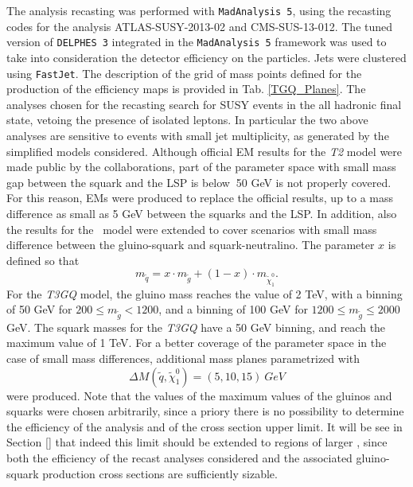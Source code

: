 \documentclass[epj,nopacs,fleqn]{svjour}
\begin{document}
%
The analysis recasting was performed with \texttt{MadAnalysis 5}, using the recasting codes for the analysis ATLAS-SUSY-2013-02\cite{ATLAS-SUSY-2013-02MA5,ATLAS-SUSY-2013-02VALIDATION} and CMS-SUS-13-012\cite{CMS-SUS-13-012MA5,CMS-SUS-13-012VALIDATION}. The tuned version of \texttt{DELPHES 3} integrated in the \texttt{MadAnalysis 5} framework was used to take into consideration the detector efficiency on the particles. Jets were clustered using \texttt{FastJet}\cite{Cacciari:2011ma}.
%
The description of the grid of mass points defined for the production of the efficiency maps is provided in Tab. \ref{TGQ_Planes}. The analyses chosen for the recasting search for SUSY events in the all hadronic final state, vetoing the presence of isolated leptons. In particular the two above analyses are sensitive to events with small jet multiplicity, as generated by the simplified models considered. Although official EM results for the \textit{T2} model were made public by the collaborations, part of the parameter space with small mass gap between the squark and the LSP is below $~$50 GeV is not properly covered. For this reason, EMs were produced to replace the official results, up to a mass difference as small as 5 GeV between the squarks and the LSP. In addition, also the results for the \Tfive~model were extended to cover scenarios with small mass difference between the gluino-squark and squark-neutralino. The parameter $x$ is defined so that
\begin{equation}
	m_{\tilde q}= x\cdot m_{\tilde g} + (1-x)\cdot m_{\tilde \chi_1 ^0}.
\end{equation}
%
For the \textit{T3GQ} model, the gluino mass reaches the value of 2 TeV, with a binning of 50 GeV for $200 \leq m_{\tilde g} < 1200$, and a binning of 100 GeV for $1200 \leq m_{\tilde g}  \leq 2000$ GeV. The squark masses for the \textit{T3GQ} have a 50 GeV binning, and reach the maximum value of 1 TeV. For a better coverage of the parameter space in the case of small mass differences, additional mass planes parametrized with 
\begin{equation}
\Delta M ( \tilde q, \tilde \chi _1 ^0)=(5,10,15) \ GeV
\end{equation}
were produced. Note that the values of the maximum values of the gluinos and squarks were chosen arbitrarily, since a priory there is no possibility to determine the efficiency of the analysis and of the cross section upper limit. It will be see in Section \ref{} that indeed this limit should be extended to regions of larger \MGLU, since both the efficiency of the recast analyses considered and the associated gluino-squark production cross sections are sufficiently sizable. 
\end{document}
